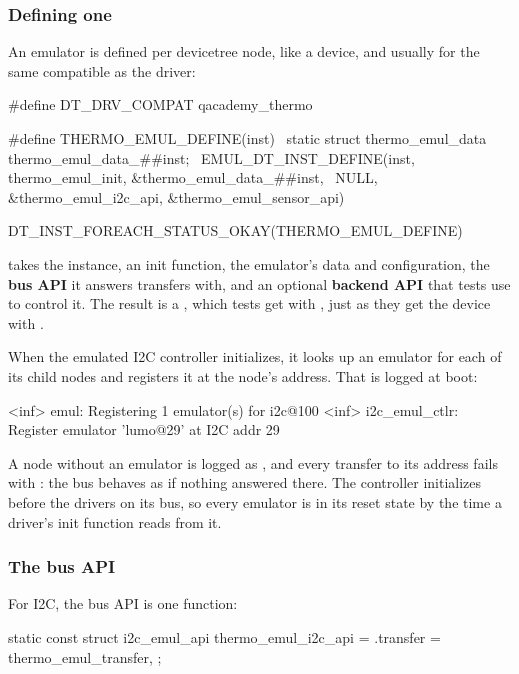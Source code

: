 \subsubsection{Defining one}
An emulator is defined per devicetree node, like a device, and usually for the same compatible as
the driver:

\begin{ccode}
#define DT_DRV_COMPAT qacademy_thermo

#define THERMO_EMUL_DEFINE(inst)                                            \
    static struct thermo_emul_data thermo_emul_data_##inst;                 \
    EMUL_DT_INST_DEFINE(inst, thermo_emul_init, &thermo_emul_data_##inst,   \
                        NULL, &thermo_emul_i2c_api, &thermo_emul_sensor_api)

DT_INST_FOREACH_STATUS_OKAY(THERMO_EMUL_DEFINE)
\end{ccode}

\noindent {} takes the instance, an init function, the emulator’s data and
configuration, the \textbf{bus API} it answers transfers with, and an optional \textbf{backend API}
that tests use to control it. The result is a , which tests get with
\code{EMUL_DT_GET(node)}, just as they get the device with \code{DEVICE_DT_GET(node)}.

When the emulated I2C controller initializes, it looks up an emulator for each of its child nodes
and registers it at the node’s address. That is logged at boot:

\begin{console}
<inf> emul: Registering 1 emulator(s) for i2c@100
<inf> i2c_emul_ctlr: Register emulator 'lumo@29' at I2C addr 29
\end{console}

A node without an emulator is logged as , and every
transfer to its address fails with : the bus behaves as if nothing answered there. The
controller initializes before the drivers on its bus, so every emulator is in its reset state by the
time a driver’s init function reads from it.

\subsubsection{The bus API}
For I2C, the bus API is one function:

\begin{ccode}
static const struct i2c_emul_api thermo_emul_i2c_api = {
	.transfer = thermo_emul_transfer,
};
\end{ccode}


